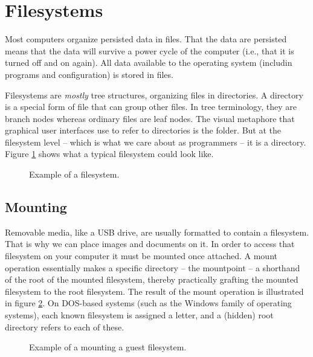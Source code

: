 \section{Filesystems}

Most computers organize persisted data in files. That the data are persisted means that the data will survive a power cycle of the computer (i.e., that it is turned off and on again). All data available to the operating system (includin programs and configuration) is stored in files.

Filesystems are \textsl{mostly} tree structures, organizing files in directories. A directory is a special form of file that can group other files. In tree terminology, they are branch nodes whereas ordinary files are leaf nodes. The visual metaphore that graphical user interfaces use to refer to directories is the folder. But at the filesystem level -- which is what we care about as programmers -- it is a directory. Figure \ref{fig:bs:fs} shows what a typical filesystem could look like.

\begin{figure}[tbp]
  
  \caption{Example of a filesystem.}
  \label{fig:bs:fs}
\end{figure}

\subsection{Mounting}

Removable media, like a USB drive, are usually formatted to contain a filesystem. That is why we can place images and documents on it. In order to access that filesystem on your computer it must be mounted once attached. A mount operation essentially makes a specific directory -- the mountpoint -- a shorthand of the root of the mounted filesystem, thereby practically grafting the mounted filesystem to the root filesystem. The result of the mount operation is illustrated in figure \ref{fig:bs:fs:mounting}. On DOS-based systems (such as the Windows family of operating systems),
each known filesystem is assigned a letter, and a (hidden) root directory refers
to each of these.

\begin{figure}[tbp]
  
  \caption{Example of a mounting a guest filesystem.}
  \label{fig:bs:fs:mounting}
\end{figure}

